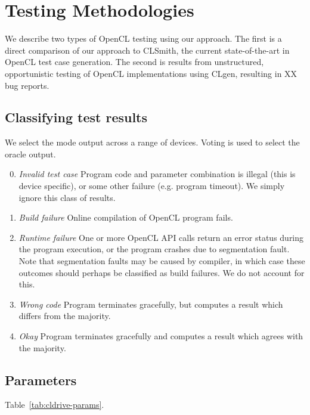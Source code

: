 \section{Testing Methodologies}\label{sec:methodology}

We describe two types of OpenCL testing using our approach. The first is a direct comparison of our approach to CLSmith, the current state-of-the-art in OpenCL test case generation. The second is results from unstructured, opportunistic testing of OpenCL implementations using CLgen, resulting in XX bug reports.


\subsection{Classifying test results}

We select the mode output across a range of devices. Voting is used to select the oracle output.
%
\begin{enumerate}
	\setcounter{enumi}{-1}
	\item \emph{Invalid test case} Program code and parameter combination is illegal (this is device specific), or some other failure (e.g. program timeout). We simply ignore this class of results.
	\item \emph{Build failure} Online compilation of OpenCL program fails.
	\item \emph{Runtime failure} One or more OpenCL API calls return an error status during the program execution, or the program crashes due to segmentation fault. Note that segmentation faults may be caused by compiler, in which case these outcomes should perhaps be classified as build failures. We do not account for this.
	\item \emph{Wrong code} Program terminates gracefully, but computes a result which differs from the majority.
	\item \emph{Okay} Program terminates gracefully and computes a result which agrees with the majority.
\end{enumerate}


\subsection{Parameters}

Table~\ref{tab:cldrive-params}. 
